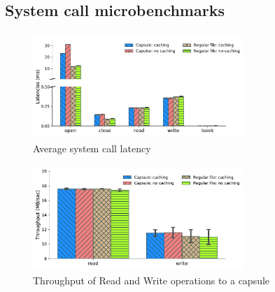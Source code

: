 


\subsection{System call microbenchmarks}


\begin{figure}[t]
  \includegraphics[width=8cm,height=4cm]{fig/latencies.pdf}
  \caption{Average system call latency}
  \label{fig:latencies}
\end{figure}

\begin{figure}[t]
  \includegraphics[width=8cm,height=4cm]{fig/rw_throughput.pdf}
  \caption{Throughput of Read and Write operations to a capsule}
  \label{fig:rw_throughput}
\end{figure}


